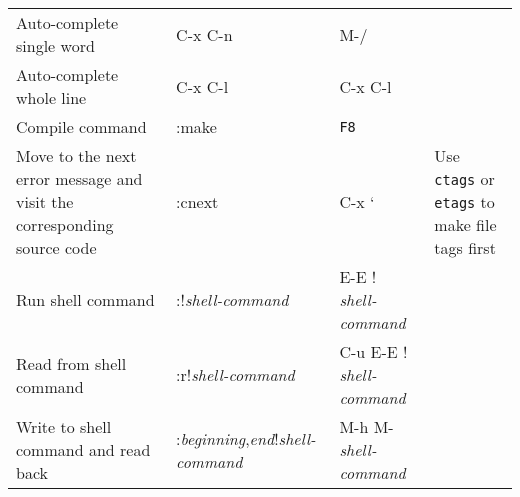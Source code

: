 \begin{table}[htbp]
\begin{minipage}{\linewidth}
\begin{tabulary}{\textwidth}{@{}LLLL@{}}
Auto-complete single word&C-x C-n&M-\slash &\\
Auto-complete whole line&C-x C-l&C-x C-l&\\
Compile command&:make&\texttt{F8}&\\
Move to the next error message and visit the corresponding source code&:cnext&C-x `&Use \texttt{ctags} or \texttt{etags} to make file tags first\\
Run shell command&:!\emph{shell-command}&E-E ! \emph{shell-command}&\\
Read from shell command&:r!\emph{shell-command}&C-u E-E ! \emph{shell-command}&\\
Write to shell command and read back&:\emph{beginning},\emph{end}!\emph{shell-command}&M-h M- \emph{shell-command}&\\

\bottomrule

\end{tabulary}
\end{minipage}
\end{table}


